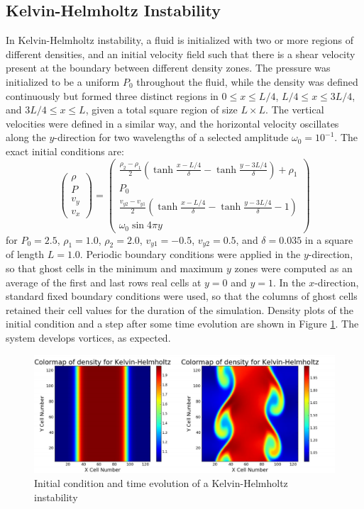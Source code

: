 \documentclass{article}
\begin{document}
\subsection{Kelvin-Helmholtz Instability}
In Kelvin-Helmholtz instability, a fluid is initialized with two or more regions of different densities, and an initial velocity field such that there is a shear velocity present at the boundary between different density zones. The pressure was initialized to be a uniform $P_0$ throughout the fluid, while the density was defined continuously but formed three distinct regions in $0 \leq x \leq L/4$, $ L/4 \leq x \leq 3L/4$, and $ 3L/4 \leq x \leq L$, given a total square region of size $L \times L$. The vertical velocities were defined in a similar way, and the horizontal velocity oscillates along the $y$-direction for two wavelengths of a selected amplitude $\omega_0 = 10^{-1}$. The exact initial conditions are:
$$\begin{pmatrix} \rho \\ P \\ v_y \\ v_x \end{pmatrix}
 = \begin{pmatrix}\frac{\rho_2 - \rho_1}{2} \left( \tanh \frac{x-L/4}{\delta} - \tanh \frac{y - 3L/4}{\delta} \right) + \rho_1 \\
 P_0 \\
 \frac{v_{y2} - v_{y1}}{2} \left( \tanh \frac{x-L/4}{\delta} - \tanh \frac{y - 3L/4}{\delta} -1 \right) \\
 \omega_0 \sin{4 \pi y}\end{pmatrix}$$ for $P_0 = 2.5$, $\rho_1 = 1.0$, $\rho_2 = 2.0$, $v_{y1} = -0.5$, $v_{y2} = 0.5$, and $\delta = 0.035$ in a square of length $L = 1.0$. Periodic boundary conditions were applied in the $y$-direction, so that ghost cells in the minimum and maximum $y$ zones were computed as an average of the first and last rows real cells at $y = 0$ and $y=1$. In the $x$-direction, standard fixed boundary conditions were used, so that the columns of ghost cells retained their cell values for the duration of the simulation. Density plots of the initial condition and a step after some time evolution are shown in Figure \ref{f:kh}. The system develops vortices, as expected.
 
 \begin{figure}
     \centering
     \includegraphics[width=\textwidth]{figKH.png}
     \caption{Initial condition and time evolution of a Kelvin-Helmholtz instability}
     \label{f:kh}
 \end{figure}
\end{document}
